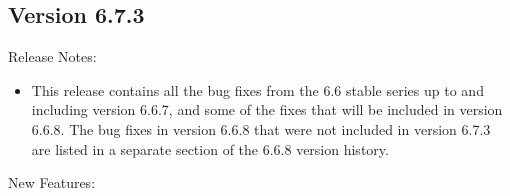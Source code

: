 \subsection*{\label{sec:New-6-7-3}Version 6.7.3}

\noindent Release Notes:

\begin{itemize}

\item This release contains all the bug fixes from the 6.6 stable
  series up to and including version 6.6.7, and some of the fixes that
  will be included in version 6.6.8.
  The bug fixes in version 6.6.8 that were not included in version
  6.7.3 are listed in a separate section of the 6.6.8 version
  history. 

\end{itemize}


\noindent New Features:

